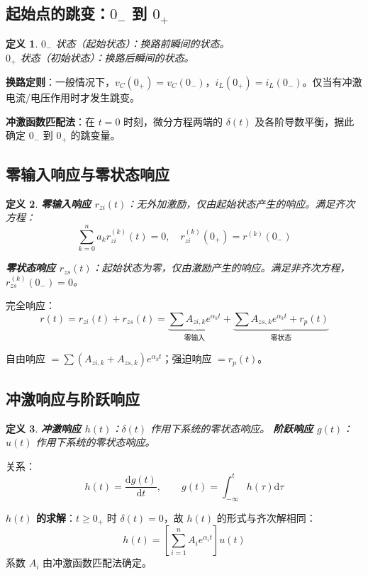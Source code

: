 \documentclass[11pt,a4paper]{ctexart}
\newtheorem{definition}{定义}[section]
\newcommand{\dd}{\mathrm{d}}            %
\newcommand{\dirac}{\delta}             %
\begin{document}
\subsection{起始点的跳变：$0_-$ 到 $0_+$}

\begin{definition}
$0_-$ 状态（起始状态）：换路前瞬间的状态。\\
$0_+$ 状态（初始状态）：换路后瞬间的状态。
\end{definition}

\textbf{换路定则}：一般情况下，$v_C(0_+) = v_C(0_-)$，$i_L(0_+) = i_L(0_-)$。仅当有冲激电流/电压作用时才发生跳变。

\textbf{冲激函数匹配法}：在 $t = 0$ 时刻，微分方程两端的 $\dirac(t)$ 及各阶导数平衡，据此确定 $0_-$ 到 $0_+$ 的跳变量。

\subsection{零输入响应与零状态响应}

\begin{definition}
\textbf{零输入响应 $r_{zi}(t)$}：无外加激励，仅由起始状态产生的响应。满足齐次方程：
\[
\sum_{k=0}^{n} a_k r_{zi}^{(k)}(t) = 0,\quad r_{zi}^{(k)}(0_+) = r^{(k)}(0_-)
\]

\textbf{零状态响应 $r_{zs}(t)$}：起始状态为零，仅由激励产生的响应。满足非齐次方程，$r_{zs}^{(k)}(0_-) = 0$。
\end{definition}

完全响应：
\[
r(t) = r_{zi}(t) + r_{zs}(t)
= \underbrace{\sum A_{zi,k}e^{\alpha_k t}}_{\text{零输入}} + \underbrace{\sum A_{zs,k}e^{\alpha_k t} + r_p(t)}_{\text{零状态}}
\]

自由响应 $= \sum(A_{zi,k} + A_{zs,k})e^{\alpha_k t}$；强迫响应 $= r_p(t)$。

\subsection{冲激响应与阶跃响应}

\begin{definition}
\textbf{冲激响应 $h(t)$}：$\dirac(t)$ 作用下系统的零状态响应。
\textbf{阶跃响应 $g(t)$}：$u(t)$ 作用下系统的零状态响应。
\end{definition}

关系：
\[
h(t) = \frac{\dd g(t)}{\dd t},\qquad g(t) = \int_{-\infty}^{t} h(\tau)\dd\tau
\]

\textbf{$h(t)$ 的求解}：$t \ge 0_+$ 时 $\dirac(t) = 0$，故 $h(t)$ 的形式与齐次解相同：
\[
h(t) = \left[\sum_{i=1}^{n} A_i e^{\alpha_i t}\right]u(t)
\]
系数 $A_i$ 由冲激函数匹配法确定。
\end{document}

